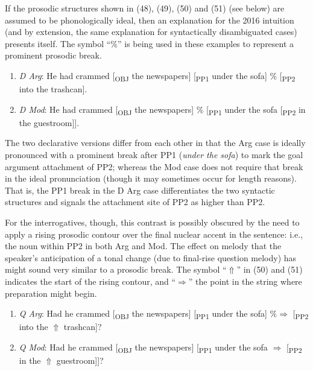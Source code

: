 \documentclass[11pt,oneside]{book}
\providecommand{\tightlist}{%
  \setlength{\itemsep}{0pt}\setlength{\parskip}{0pt}}
\begin{document}
If the prosodic structures shown in (48), (49), (50) and (51) (see below) are assumed to be phonologically ideal, then an explanation for the 2016 intuition (and by extension, the same explanation for syntactically disambiguated cases) presents itself. The symbol ``\%'' is being used in these examples to represent a prominent prosodic break.

\begin{enumerate}
\def\labelenumi{(\arabic{enumi})}
\setcounter{enumi}{47}
\tightlist
\item
  \emph{D Arg}: He had crammed {[}\textsubscript{OBJ} the newspapers{]} {[}\textsubscript{PP1} under the sofa{]} \% {[}\textsubscript{PP2} into the trashcan{]}.
\item
  \emph{D Mod}: He had crammed {[}\textsubscript{OBJ} the newspapers{]} \% {[}\textsubscript{PP1} under the sofa {[}\textsubscript{PP2} in the guestroom{]}{]}.
\end{enumerate}

The two declarative versions differ from each other in that the Arg case is ideally pronounced with a prominent break after PP1 (\emph{under the sofa}) to mark the goal argument attachment of PP2; whereas the Mod case does not require that break in the ideal pronunciation (though it may sometimes occur for length reasons). That is, the PP1 break in the D Arg case differentiates the two syntactic structures and signals the attachment site of PP2 as higher than PP2.

For the interrogatives, though, this contrast is possibly obscured by the need to apply a rising prosodic contour over the final nuclear accent in the sentence: i.e., the noun within PP2 in both Arg and Mod. The effect on melody that the speaker's anticipation of a tonal change (due to final-rise question melody) has might sound very similar to a prosodic break. The symbol ``\(\Uparrow\)'' in (50) and (51) indicates the start of the rising contour, and ``\(\Rightarrow\)'' the point in the string where preparation might begin.

\begin{enumerate}
\def\labelenumi{(\arabic{enumi})}
\setcounter{enumi}{49}
\tightlist
\item
  \emph{Q Arg}: Had he crammed {[}\textsubscript{OBJ} the newspapers{]} {[}\textsubscript{PP1} under the sofa{]} \%\(\Rightarrow\) {[}\textsubscript{PP2} into the \(\Uparrow\) trashcan{]}?
\item
  \emph{Q Mod}: Had he crammed {[}\textsubscript{OBJ} the newspapers{]} {[}\textsubscript{PP1} under the sofa \(\Rightarrow\) {[}\textsubscript{PP2} in the \(\Uparrow\) guestroom{]}{]}?
\end{enumerate}
\end{document}
